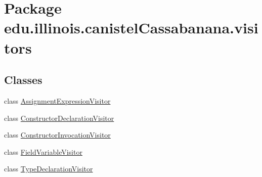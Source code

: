 \hypertarget{namespaceedu_1_1illinois_1_1canistelCassabanana_1_1visitors}{
\section{Package edu.illinois.canistelCassabanana.visitors}
\label{namespaceedu_1_1illinois_1_1canistelCassabanana_1_1visitors}
}
\subsection*{Classes}
\begin{DoxyCompactItemize}
\item 
class \hyperlink{classedu_1_1illinois_1_1canistelCassabanana_1_1visitors_1_1AssignmentExpressionVisitor}{AssignmentExpressionVisitor}
\item 
class \hyperlink{classedu_1_1illinois_1_1canistelCassabanana_1_1visitors_1_1ConstructorDeclarationVisitor}{ConstructorDeclarationVisitor}
\item 
class \hyperlink{classedu_1_1illinois_1_1canistelCassabanana_1_1visitors_1_1ConstructorInvocationVisitor}{ConstructorInvocationVisitor}
\item 
class \hyperlink{classedu_1_1illinois_1_1canistelCassabanana_1_1visitors_1_1FieldVariableVisitor}{FieldVariableVisitor}
\item 
class \hyperlink{classedu_1_1illinois_1_1canistelCassabanana_1_1visitors_1_1TypeDeclarationVisitor}{TypeDeclarationVisitor}
\end{DoxyCompactItemize}
